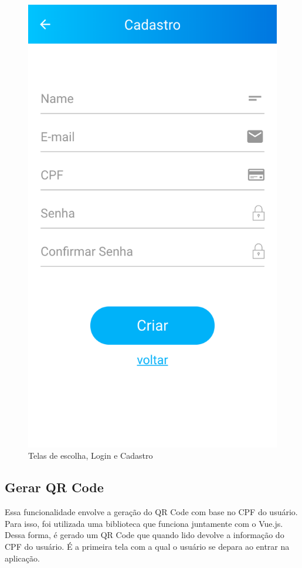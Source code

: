 \begin{figure}[!ht]
		\includegraphics[scale=0.2]{figuras/software/signup.png}
	\caption{Telas de escolha, Login e Cadastro}
	\label{fig:login}
\end{figure}

\subsection{Gerar QR Code}

Essa funcionalidade envolve a geração do QR Code com base no CPF do usuário. Para isso, foi utilizada uma biblioteca que funciona juntamente com o Vue.js. Dessa forma, é gerado um QR Code que quando lido devolve a informação do CPF do usuário. É a primeira tela com a qual o usuário se depara ao entrar na aplicação.

